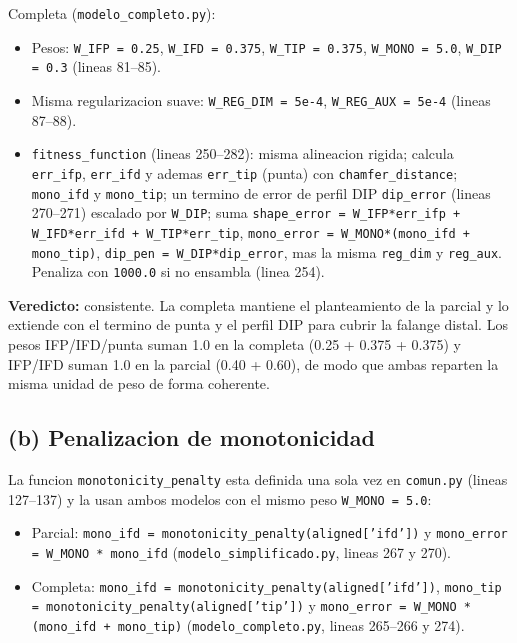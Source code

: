 \documentclass[11pt,a4paper]{article}
\newcommand{\code}[1]{\texttt{#1}}
\begin{document}
Completa (\code{modelo\_completo.py}):

\begin{itemize}[leftmargin=1.4em]
  \item Pesos: \code{W\_IFP = 0.25}, \code{W\_IFD = 0.375}, \code{W\_TIP = 0.375},
        \code{W\_MONO = 5.0}, \code{W\_DIP = 0.3} (lineas 81--85).
  \item Misma regularizacion suave: \code{W\_REG\_DIM = 5e-4},
        \code{W\_REG\_AUX = 5e-4} (lineas 87--88).
  \item \code{fitness\_function} (lineas 250--282): misma alineacion rigida;
        calcula \code{err\_ifp}, \code{err\_ifd} y ademas \code{err\_tip} (punta)
        con \code{chamfer\_distance}; \code{mono\_ifd} y \code{mono\_tip}; un
        termino de error de perfil DIP \code{dip\_error} (lineas 270--271)
        escalado por \code{W\_DIP}; suma
        \code{shape\_error = W\_IFP*err\_ifp + W\_IFD*err\_ifd + W\_TIP*err\_tip},
        \code{mono\_error = W\_MONO*(mono\_ifd + mono\_tip)},
        \code{dip\_pen = W\_DIP*dip\_error}, mas la misma \code{reg\_dim} y
        \code{reg\_aux}. Penaliza con \code{1000.0} si no ensambla (linea 254).
\end{itemize}

\textbf{Veredicto:} consistente. La completa mantiene el planteamiento de la
parcial y lo extiende con el termino de punta y el perfil DIP para cubrir la
falange distal. Los pesos IFP/IFD/punta suman 1.0 en la completa (0.25 + 0.375 +
0.375) y IFP/IFD suman 1.0 en la parcial (0.40 + 0.60), de modo que ambas
reparten la misma unidad de peso de forma coherente.

\subsection{(b) Penalizacion de monotonicidad}

La funcion \code{monotonicity\_penalty} esta definida una sola vez en
\code{comun.py} (lineas 127--137) y la usan ambos modelos con el mismo peso
\code{W\_MONO = 5.0}:

\begin{itemize}[leftmargin=1.4em]
  \item Parcial: \code{mono\_ifd = monotonicity\_penalty(aligned['ifd'])} y
        \code{mono\_error = W\_MONO * mono\_ifd}
        (\code{modelo\_simplificado.py}, lineas 267 y 270).
  \item Completa: \code{mono\_ifd = monotonicity\_penalty(aligned['ifd'])},
        \code{mono\_tip = monotonicity\_penalty(aligned['tip'])} y
        \code{mono\_error = W\_MONO * (mono\_ifd + mono\_tip)}
        (\code{modelo\_completo.py}, lineas 265--266 y 274).
\end{itemize}
\end{document}
